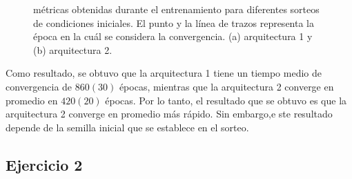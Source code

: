 \documentclass[11pt, twocolumn]{article}
\begin{document}
\begin{figure}[htbp]
  \centering
  \hfill
  \hfill
  \caption{métricas obtenidas durante el entrenamiento para diferentes sorteos de condiciones iniciales. El punto y la línea de trazos representa la época en la cuál se considera la convergencia. (a) arquitectura 1 y (b) arquitectura 2.}
  \label{fig:metrics_e1}
\end{figure}


Como resultado, se obtuvo que la arquitectura 1 tiene un tiempo medio de convergencia de \(860(30)\) épocas, mientras que la arquitectura 2 converge en promedio en \(420(20)\) épocas. Por lo tanto, el resultado que se obtuvo es que la arquitectura 2 converge en promedio más rápido. Sin embargo,e ste resultado depende de la semilla inicial que se establece en el sorteo.

\subsection*{Ejercicio 2}
\end{document}
